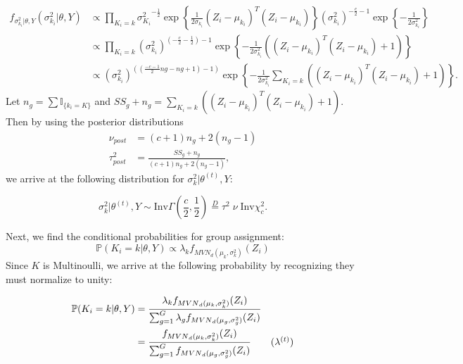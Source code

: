 \documentclass{article}
\begin{document}
\begin{align*}
f_{\sigma_{k_i}^2|\theta, Y}(\sigma_{k_i}^2|\theta, Y) &\propto \prod_{K_i = k} 
{\sigma_{K_i}^2}^{-\frac{1}{2}} 
\exp \left\{ \frac{1}{2 \sigma_{k_i}}(Z_i-\mu_{k_i})^T(Z_i-\mu_{k_i})\right\} 
(\sigma_{k_i}^2)^{-\frac{c}{2} -1}  
 \exp \left\{-\frac{1}{2 \sigma_{k_i}^2}\right\} \\
 &\propto  \prod_{K_i = k} (\sigma_{k_i} ^2 )^{(- \frac{c}{2} - \frac{1}{2}) -1}  
 \exp\left\{-\frac{1}{2 \sigma_{k_i}^2}\left((Z_i-\mu_{k_i})^T(Z_i-\mu_{k_i})+1\right)\right\} \\
 & \propto (\sigma_{k_i} ^2 )^{\left( (\frac{-c-1}{2} ng - ng +1 ) -1\right)}  
 \exp\left\{-\frac{1}{2 \sigma_{k_i}^2} \sum_{K_i = k} \left((Z_i-\mu_{k_i})^T(Z_i-\mu_{k_i})+1\right)\right\}.
 \end{align*}
 Let $n_g = \sum \mathbb{I} _{\{ k_i = K\}}$ and $SS_g + n_g = \sum_{K_i = k} \left((Z_i-\mu_{k_i})^T(Z_i-\mu_{k_i})+1\right) $. 
Then by using the posterior distributions 
\begin{align*}
\nu_{post} &= (c + 1) n_g + 2( n_g - 1 )   \\
 \tau^2_{post} &= \frac{SS_g + n_g} {(c + 1) n_g + 2 ( n_g -1)},
 \end{align*} 
 we arrive at the following distribution for $\sigma_k^2 | \theta^{(t)}, Y$:


$$ \sigma_k^2 | \theta^{(t)}, Y \sim \text{Inv} \Gamma ( \frac{c}{2}, \frac{1}{2})  \overset{D}= \tau^2  \;\nu \; \text{Inv} \chi^2_c. $$

Next, we find the conditional probabilities for group assignment:
\[\mathbb{P}(K_i = k | \theta, Y) \propto \lambda_k f_{{MVN}_d(\mu_k, \sigma_k^2)}(Z_i)\]
Since $K$ is Multinoulli, we arrive at the following probability by recognizing they must normalize to unity:

\begin{align*}
\mathbb{P}(K_i = k | \theta, Y) &= \frac{\lambda_k f_{{MVN}_d(\mu_k, \sigma_k^2)}(Z_i)}{\sum_{g=1}^G\lambda_g f_{{MVN}_d(\mu_g, \sigma_g^2)}(Z_i)} \\
&= \frac{f_{{MVN}_d(\mu_k, \sigma_k^2)}(Z_i)}{\sum_{g=1}^G f_{{MVN}_d(\mu_g, \sigma_g^2)}(Z_i)} \tag{$\lambda^{(t)}$}
\end{align*}
\end{document}
